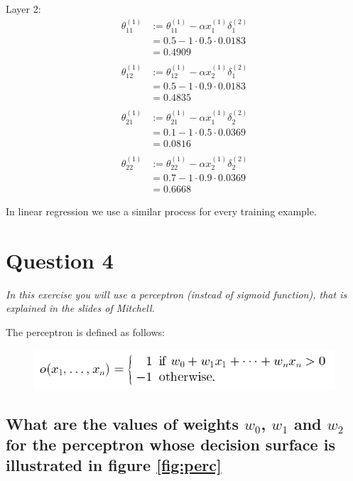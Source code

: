 \documentclass{article}
\begin{document}
Layer 2:
\begin{align*}
\theta_{11}^{(1)} &:= \theta_{11}^{(1)} - \alpha x_1^{(1)} \delta_1^{(2)} \\
&= 0.5 - 1 \cdot 0.5 \cdot 0.0183\\
&= 0.4909\\
\\
\theta_{12}^{(1)} &:= \theta_{12}^{(1)} - \alpha x_2^{(1)} \delta_1^{(2)} \\
&= 0.5 - 1 \cdot 0.9 \cdot 0.0183\\
&= 0.4835 \\
\\
\theta_{21}^{(1)} &:= \theta_{21}^{(1)} - \alpha x_1^{(1)} \delta_2^{(2)} \\
&= 0.1 - 1 \cdot  0.5 \cdot 0.0369 \\
&= 0.0816 \\
\\
\theta_{22}^{(1)} &:= \theta_{22}^{(1)} - \alpha x_2^{(1)} \delta_2^{(2)} \\
&= 0.7 - 1 \cdot 0.9 \cdot 0.0369\\
&= 0.6668
\end{align*}

In linear regression we use a similar process for every training example.

\pagebreak

\section{Question 4}
\textit{In this exercise you will use a perceptron (instead of sigmoid function), that is explained in the
slides of Mitchell. }
 
The perceptron is defined as follows:

\begin{figure} [h!]
	\includegraphics[width=\linewidth]{perceptronDef.png}
\end{figure}

\subsection{What are the values of weights $w_0$, $w_1$ and $w_2$ for the perceptron whose decision surface is
illustrated in figure \ref{fig:perc}}
\end{document}
